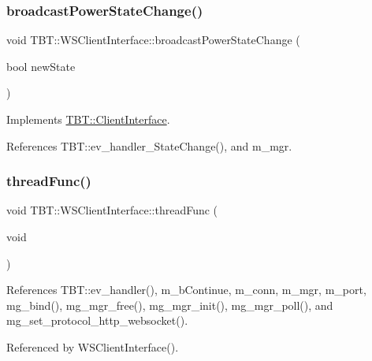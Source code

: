 \subsubsection{\texorpdfstring{broadcast\+Power\+State\+Change()}{broadcastPowerStateChange()}}
{\footnotesize\ttfamily void T\+B\+T\+::\+W\+S\+Client\+Interface\+::broadcast\+Power\+State\+Change (\begin{DoxyParamCaption}\item[{bool}]{new\+State }\end{DoxyParamCaption})\hspace{0.3cm}{\ttfamily [virtual]}}



Implements \hyperlink{classTBT_1_1ClientInterface_a7888a3446fb416fad75e5e008a85ca0c_a7888a3446fb416fad75e5e008a85ca0c}{T\+B\+T\+::\+Client\+Interface}.



References T\+B\+T\+::ev\+\_\+handler\+\_\+\+State\+Change(), and m\+\_\+mgr.

\mbox{\label{classTBT_1_1WSClientInterface_a31d6d80e7a6cfb760d3ceee536477677_a31d6d80e7a6cfb760d3ceee536477677}} 
\subsubsection{\texorpdfstring{thread\+Func()}{threadFunc()}}
{\footnotesize\ttfamily void T\+B\+T\+::\+W\+S\+Client\+Interface\+::thread\+Func (\begin{DoxyParamCaption}\item[{void}]{ }\end{DoxyParamCaption})\hspace{0.3cm}{\ttfamily [private]}}



References T\+B\+T\+::ev\+\_\+handler(), m\+\_\+b\+Continue, m\+\_\+conn, m\+\_\+mgr, m\+\_\+port, mg\+\_\+bind(), mg\+\_\+mgr\+\_\+free(), mg\+\_\+mgr\+\_\+init(), mg\+\_\+mgr\+\_\+poll(), and mg\+\_\+set\+\_\+protocol\+\_\+http\+\_\+websocket().



Referenced by W\+S\+Client\+Interface().



